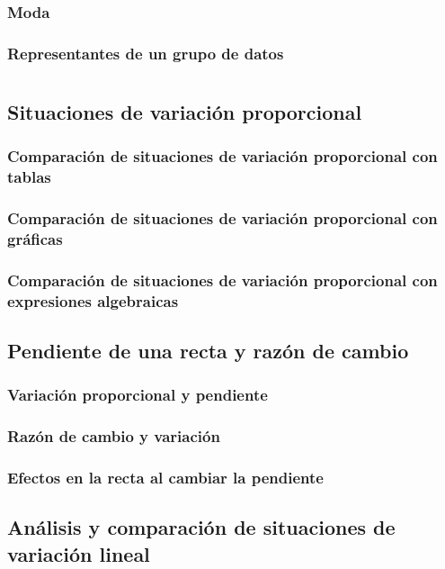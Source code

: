 \documentclass[11pt]{book}
\begin{document}
\subsection{Moda}
\subsection{Representantes de un grupo de datos}

\chapter{}

\section{Situaciones de variación proporcional}
\subsection{Comparación de situaciones de variación proporcional con tablas}
\subsection{Comparación de situaciones de variación proporcional con gráficas}
\subsection{Comparación de situaciones de variación proporcional con expresiones algebraicas}




\newpage
\section{Pendiente de una recta y razón de cambio}
\subsection{Variación proporcional y pendiente}
\subsection{Razón de cambio y variación}
\subsection{Efectos en la recta al cambiar la pendiente}

\newpage
\section{Análisis y comparación de situaciones de variación lineal}
\end{document}
